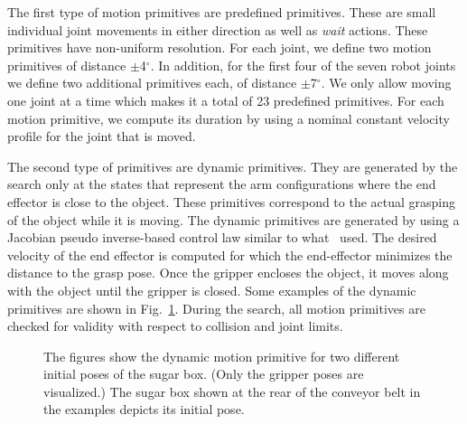 \documentclass[a4paper]{report}
\begin{document}
The first type of motion primitives are predefined primitives. These are small individual joint movements in either direction as well as \emph{wait} actions.
These primitives have non-uniform resolution. For each joint, we define two  motion primitives of distance $\pm$4$^{\circ}$. In addition, for the first four of the seven robot joints we define  two additional  primitives each, of distance $\pm$7$^{\circ}$. We only allow moving one joint at a time which makes it a total of 23 predefined primitives.
For each motion primitive, we compute its duration by using a nominal constant velocity profile for the  joint that is moved.
%

The second type of primitives are dynamic primitives. They are generated by the search only at the states that represent the arm configurations where the end effector is close to the object. These primitives correspond to the actual grasping of the object while it is moving.
The dynamic primitives are generated by using a Jacobian pseudo inverse-based control law similar to what~\cite{menon2014motion} used. 
The desired velocity of the end effector is computed for which the end-effector minimizes the distance to the grasp pose. Once the gripper encloses the object, it moves along with the object until the gripper is closed. Some examples of the dynamic primitives are shown in Fig.~\ref{fig:amp}. During the search, all motion primitives are checked for validity with respect to collision and joint limits.

\begin{figure}[t]
    \centering
    \caption{
    The figures show the dynamic motion primitive for two different initial poses of the sugar box. (Only the gripper poses are visualized.) The sugar box shown at the rear of the conveyor belt in the examples depicts its initial pose.
    }
    \label{fig:amp}
\end{figure}
\end{document}
